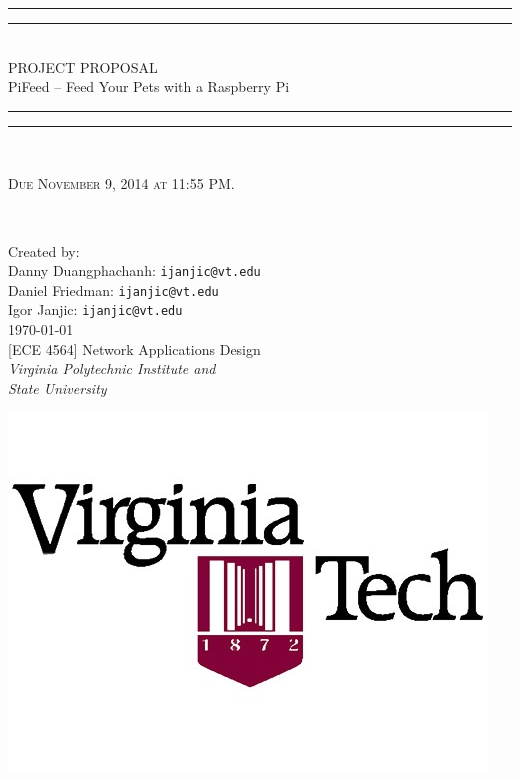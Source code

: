 
\begin{titlepage}

\centering
\vspace*{\baselineskip}

\rule{\textwidth}{1.6pt}\vspace*{-\baselineskip}\vspace*{2pt}
\rule{\textwidth}{0.4pt}\\[\baselineskip]

{\LARGE PROJECT PROPOSAL\\[0.3\baselineskip]
PiFeed -- Feed Your Pets with a Raspberry Pi\\[0.2\baselineskip]
 }

\rule{\textwidth}{0.4pt}\vspace*{-\baselineskip}\vspace{3.2pt}
\rule{\textwidth}{1.6pt}\\[\baselineskip]

\wl

\scshape Due November 9, 2014 at 11:55 PM.
{\small 
\\[\baselineskip]\par}

\vfill

Created by:\\[0.2\baselineskip]
{Danny Duangphachanh: \texttt{ijanjic@vt.edu}}\\[0.2\baselineskip]
{Daniel Friedman:     \texttt{ijanjic@vt.edu}}\\[0.2\baselineskip]
{Igor Janjic:         \texttt{ijanjic@vt.edu}}\\[0.4\baselineskip]
{\small \today}\\[0.8\baselineskip]
{\small [ECE 4564] Network Applications Design}\\[0.2\baselineskip]
{\small\itshape Virginia Polytechnic Institute and\\ State University}\\[0.2\baselineskip]

\begin{center}
	\includegraphics[scale=0.35]{images/Logo}
\end{center}

\end{titlepage}
